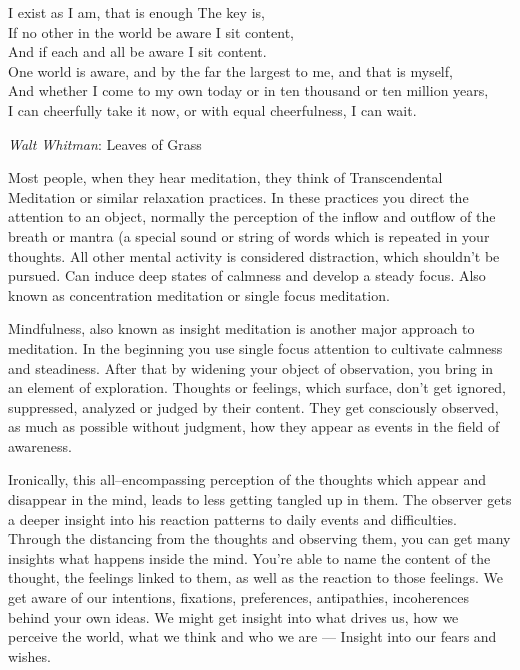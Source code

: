 \documentclass[../Book.Stress_regulation.tex]{subfiles}
\begin{document}
\setlength{}

 \epigraph{I exist as I am, that is enough
The key is, \\
If no other in the world be aware I sit content,\\
And if each and all be aware I sit content.\\
One world is aware, and by the far the largest to me, and that is myself,\\
And whether I come to my own today or in ten thousand or ten million years,\\
I can cheerfully take it now, or with equal cheerfulness, I can wait.}{\textit{Walt Whitman}: Leaves of Grass}
\setlength{}

Most people, when they hear meditation, they think of {Transcendental Meditation\texttrademark} or similar relaxation practices.
In these practices you  {direct the attention to an object}, normally the perception of the inflow and outflow of the {breath or mantra} (a special sound or string of words which is repeated in your thoughts.
All other mental activity is considered {distraction}, which shouldn't be pursued.
Can induce deep states of {calmness} and {develop a steady focus}.
Also known as concentration meditation or {single focus meditation}.   

Mindfulness, also known as {insight meditation} is another major approach to meditation.
In the beginning you use single focus attention to cultivate calmness and steadiness.
After that by {widening your object of observation}, you bring in an element of exploration.
{Thoughts or feelings}, which surface, don't get ignored, suppressed, analyzed or judged by their content.
They get consciously {observed}, as much as possible {without judgment}, how they appear as events in the field of awareness.



Ironically, this all--encompassing perception of the thoughts which appear and disappear in the mind, leads to {less getting tangled up} in them.
The observer gets a {deeper insight} into his reaction patterns to daily events and difficulties.
Through the distancing from the thoughts and observing them, you can get many insights what happens {inside the mind}.
You're able to {name the content} of the thought, the feelings linked to them, as well as the reaction to those feelings.
We get aware of our intentions, fixations, preferences, antipathies, incoherences behind your own ideas. We might get insight into what drives us, how we perceive the world, what we think and who we are ---
Insight into our fears and wishes.
\end{document}
